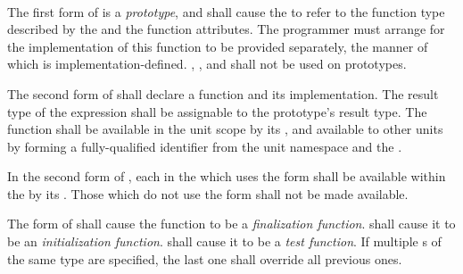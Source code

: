 \begin{grammar}
 \\
	    \\
	    \terminal{=}  \\

 \\
	 \\
	  \\

 \\
	 \\
	 \\
	 \\
	 \\
\end{grammar}

\specsubsubitem
The first form of  is a \textit{prototype},
and shall cause the  to refer to the function type
described by the  and the function attributes. The
programmer must arrange for the implementation of this function to be provided
separately, the manner of which is implementation-defined. ,
, and  shall not be used on prototypes.

\specsubsubitem
The second form of  shall declare a function
and its implementation. The result type of the expression shall be assignable
to the prototype's result type. The function shall be available in the unit
scope by its , and available to other units by forming a
fully-qualified identifier from the unit namespace and the .

\specsubsubitem
In the second form of , each
 in the  which uses the
 form shall be available within the 
by its . Those which do not use the  form
shall not be made available.

\specsubsubitem
The  form of  shall cause the
function to be a \textit{finalization function}.  shall cause it
to be an \textit{initialization function}.  shall cause it to be
a \textit{test function}. If multiple s of the same type
are specified, the last one shall override all previous ones.

